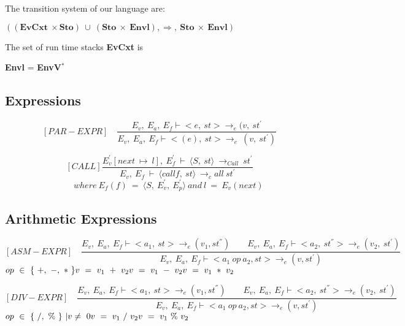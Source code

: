    	The transition system of our language are:
   	 
   	\begin{math}
   		((\boldsymbol{EvCxt} \ \times \boldsymbol{Sto}) \ \cup \ (\boldsymbol{Sto} \ \times \ \boldsymbol{Envl}), \Rightarrow, \ \boldsymbol{Sto} \ \times \ \boldsymbol{Envl})
   	\end{math}
   	
   	The set of run time stacks \textbf{EvCxt} is 
   	
   	\textbf{Envl} = \textbf{EnvV}\begin{math}
   	^*
   	\end{math}
   	
   	\subsection{Expressions}
   	
   	\[
   	[PAR-EXPR] \quad
   	\dfrac{E_v, \ E_a, \ E_f \vdash <e, \ st> \rightarrow_e (v, \ st^{'}}{E_v, \ E_a, \ E_f \vdash <(e), \ st> \rightarrow_e \ (v, \ st^{'})}
   	\]
   	
	\[
	[CALL]
	\dfrac{E_v^{'}[next \ \mapsto \ l], \ E_f^{'} \ \vdash \ \langle S, \ st \rangle \ \rightarrow_{Call} \ st^{'}}{E_v, \ E_f \ \vdash \ \langle call f, \ st \rangle \ \rightarrow_call \ st^{'}}
	\]
	\begin{math}		
		\qquad \qquad \qquad \qquad where \ E_f(f) \ = \ \langle S, \ E_v^{'}, \ E_p^{'} \rangle \
		and \ l \ = \ E_v(next)
	\end{math}
   	
   	\subsection{Arithmetic Expressions}
   	
   	\[
   	[ASM-EXPR] \quad
   	\dfrac{E_v, \ E_a, \ E_f \vdash <a_1, \ st> \rightarrow_{e} (v_1, st^{''}) \qquad E_v, \ E_a, \ E_f \vdash <a_2, \ st^{''}> \rightarrow_e (v_2, \ st^{'})}{E_v, \ E_a, \ E_f \vdash <a_1 \ op \ a_2, st> \rightarrow_{e} (v, st^{'})}
   	\]
 	\begin{math}
 	op \ \in \ \{ \ +, \ -, \ * \ \} \newline
   	v \ = \ v_1 \ + \ v_2 \newline
   	v \ = \ v_1 \ - \ v_2 \newline
   	v \ = \ v_1 \ * \ v_2
   	\end{math}
   	
   	\[
   	[DIV-EXPR] \quad
   	\dfrac{E_v, \ E_a, \ E_f \vdash <a_1, \ st> \rightarrow_{e} (v_1, st^{''}) \qquad E_v, \ E_a, \ E_f \vdash <a_2, \ st^{''}> \rightarrow_e (v_2, \ st^{'})}{E_v, \ E_a, \ E_f \vdash <a_1 \ op \ a_2, st> \rightarrow_{e} (v, st^{'})}
   	\]
   	\begin{math}
   	op \ \in \ \{ \ /, \ \% \ \} \ | v \not= \ 0 \newline 
   	v \ = \ v_1 \ / \ v_2 \newline
   	v \ = \ v_1 \ \% \ v_2
   	\end{math}   	   	   	

